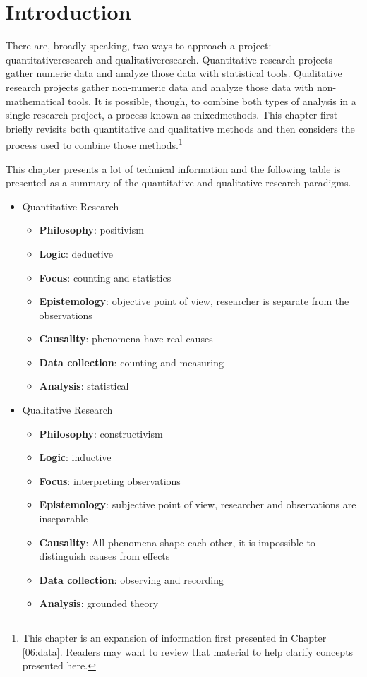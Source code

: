 \section{Introduction}

There are, broadly speaking, two ways to approach a project: \gls{quantitativeresearch} and \gls{qualitativeresearch}. Quantitative research projects gather numeric data and analyze those data with statistical tools. Qualitative research projects gather non-numeric data and analyze those data with non-mathematical tools. It is possible, though, to combine both types of analysis in a single research project, a process known as \gls{mixedmethods}. This chapter first briefly revisits both quantitative and qualitative methods and then considers the process used to combine those methods.\footnote{This chapter is an expansion of information first presented in Chapter \ref{06:data}. Readers may want to review that material to help clarify concepts presented here.}

This chapter presents a lot of technical information and the following table is presented as a summary of the quantitative and qualitative research paradigms.

\begin{itemize}
	\item Quantitative Research
	\begin{itemize}
		\item \textbf{Philosophy}: positivism
		\item \textbf{Logic}: deductive
		\item \textbf{Focus}: counting and statistics
		\item \textbf{Epistemology}: objective point of view, researcher is separate from the observations
		\item \textbf{Causality}: phenomena have real causes
		\item \textbf{Data collection}: counting and measuring
		\item \textbf{Analysis}: statistical
	\end{itemize}
	\item Qualitative Research
	\begin{itemize}
		\item \textbf{Philosophy}: constructivism
		\item \textbf{Logic}: inductive
		\item \textbf{Focus}: interpreting observations
		\item \textbf{Epistemology}: subjective point of view, researcher and observations are inseparable
		\item \textbf{Causality}: All phenomena shape each other, it is impossible to distinguish causes from effects
		\item \textbf{Data collection}: observing and recording
		\item \textbf{Analysis}: grounded theory
	\end{itemize}
	
\end{itemize}


